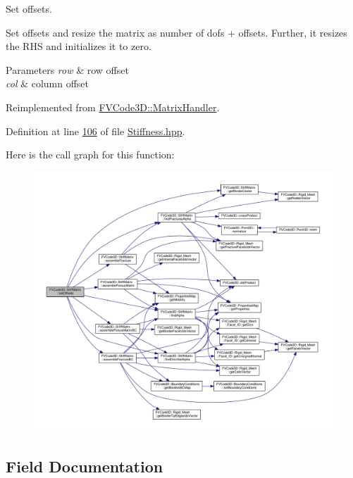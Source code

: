 Set offsets. 

Set offsets and resize the matrix as number of dofs + offsets. Further, it resizes the R\+HS and initializes it to zero. 
\begin{DoxyParams}{Parameters}
{\em row} & row offset \\
\hline
{\em col} & column offset \\
\hline
\end{DoxyParams}


Reimplemented from \hyperlink{classFVCode3D_1_1MatrixHandler_aa0943b024c7af8f53b95addb42b75e96}{F\+V\+Code3\+D\+::\+Matrix\+Handler}.



Definition at line \hyperlink{Stiffness_8hpp_source_l00106}{106} of file \hyperlink{Stiffness_8hpp_source}{Stiffness.\+hpp}.



Here is the call graph for this function\+:
\nopagebreak
\begin{figure}[H]
\begin{center}
\leavevmode
\includegraphics[width=350pt]{classFVCode3D_1_1StiffMatrix_a21f75de574e807c965eedb52f626527e_cgraph}
\end{center}
\end{figure}




\subsection{Field Documentation}
